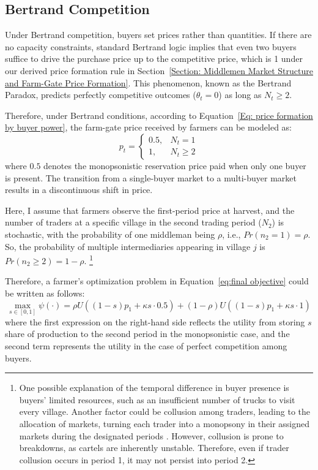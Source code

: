 \subsection{Bertrand Competition}
\noindent Under Bertrand competition, buyers set prices rather than quantities. If there are no capacity constraints, standard Bertrand logic implies that even two buyers suffice to drive the purchase price up to the competitive price, which is 1 under our derived price formation rule in Section~\ref{Section: Middlemen Market Structure and Farm-Gate Price Formation}. This phenomenon, known as the Bertrand Paradox, predicts perfectly competitive outcomes ($\theta_t=0$) as long as $N_t \geq 2$.

Therefore, under Bertrand conditions, according to Equation~\ref{Eq: price formation by buyer power}, the farm-gate price received by farmers can be modeled as:
\begin{equation}
p_t = 
\begin{cases}
0.5, & N_t = 1 \\
1, & N_t \geq 2
\end{cases}
\label{Eq: Bertrand Price Schedule}
\end{equation}
\noindent where $0.5$ denotes the monopsonistic reservation price paid when only one buyer is present. The transition from a single-buyer market to a multi-buyer market results in a discontinuous shift in price.

Here, I assume that farmers observe the first-period price at harvest, and the number of traders at a specific village in the second trading period ($N_2$) is stochastic, with the probability of one middleman being $\rho$, i.e., $Pr(n_2=1)=\rho$. So, the probability of multiple intermediaries appearing in village $j$ is $Pr(n_2 \geq 2) = 1-\rho$. \footnote{One possible explanation of the temporal difference in buyer presence is buyers' limited resources, such as an insufficient number of trucks to visit every village. Another factor could be collusion among traders, leading to the allocation of markets, turning each trader into a monopsony in their assigned markets during the designated periods \citep{herings2005intertemporal}. However, collusion is prone to breakdowns, as cartels are inherently unstable. Therefore, even if trader collusion occurs in period 1, it may not persist into period 2.}

Therefore, a farmer’s optimization problem in Equation~\ref{eq:final objective} could be written as follows:
\begin{equation}
\label{eq:Bertrand objective}
\max_{s \in [0,1]} \psi(\cdot) = \rho U((1-s)p_1 + \kappa s \cdot 0.5) + (1-\rho) U \left( (1-s)p_1 +  \kappa s \cdot 1 \right)
\end{equation}
where the first expression on the right-hand side reflects the utility from storing $s$ share of production to the second period in the monopsonistic case, and the second term represents the utility in the case of perfect competition among buyers.

